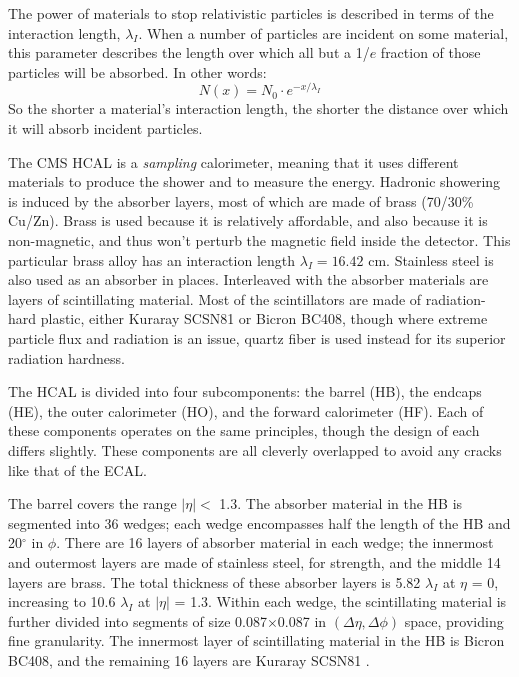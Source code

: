 The power of materials to stop relativistic particles is described in
terms of the interaction length, $\lambda_I$. When a number of
particles are incident on some material, this parameter describes
the length over which all but a 1/$e$ fraction of those particles will
be absorbed. In other words:
\begin{equation}
\label{eq:cms:hcal:intlength}
N(x) = N_0 \cdot e^{-x/\lambda_I}
\end{equation}
So the shorter a material's interaction length, the shorter the
distance over which it will absorb incident particles.

The CMS HCAL is a \emph{sampling} calorimeter, meaning that it uses
different materials to produce the shower and to measure the
energy. Hadronic showering is induced by the absorber layers, most of
which are made of brass (70/30\% Cu/Zn). Brass
is used because it is relatively affordable, and also because it is
non-magnetic, and thus won't perturb the magnetic field inside the
detector. This particular brass alloy has an interaction length
$\lambda_I = 16.42$ cm. Stainless steel is also used as an absorber in places.
Interleaved with the absorber materials are layers of
scintillating material. Most of the scintillators are made of
radiation-hard plastic, either Kuraray SCSN81 or Bicron BC408, though
where extreme particle flux and radiation is an issue, quartz fiber is
used instead for its superior radiation hardness.

The HCAL is divided into four subcomponents: the barrel (HB), the
endcaps (HE), the outer calorimeter (HO), and the forward calorimeter
(HF). Each of these components operates on the same principles, though
the design of each differs slightly. These components are all cleverly
overlapped to avoid any cracks like that of the ECAL.

The barrel covers the range $|\eta| <$ 1.3. The absorber material in
the HB is segmented into 36 wedges; each wedge encompasses half the
length of the HB and 20$^\circ$ in $\phi$. There are 16 layers of
absorber material in each wedge; the innermost and outermost layers are
made of stainless steel, for strength, and the middle 14 layers are
brass. The total thickness of these absorber layers is 5.82
$\lambda_I$ at $\eta$ = 0, increasing to 10.6 $\lambda_I$ at $|\eta|$
= 1.3. Within each wedge, the scintillating material is further
divided into segments of size 0.087$\times$0.087 in $(\Delta\eta,\Delta\phi)$
space, providing fine granularity. The innermost layer of
scintillating material in the HB is Bicron BC408, and the remaining 16
layers are Kuraray SCSN81 \cite{accelexper}.

